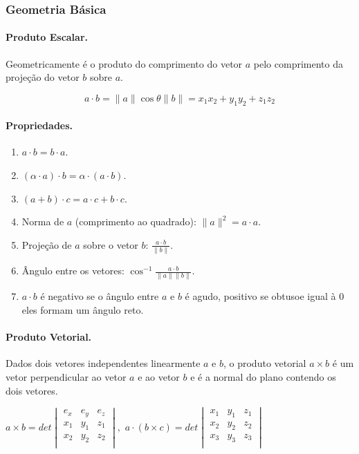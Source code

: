 \subsubsection{Geometria Básica}
\paragraph{Produto Escalar.}
Geometricamente é o produto do comprimento do vetor $a$ pelo comprimento da projeção do vetor $b$ sobre $a$.

$$a \cdot b = \|a\|\cos\theta \|b\| = x_1x_2+y_1y_2+z_1z_2$$

\paragraph{Propriedades.} \empty

\begin{multicols}{2}
	\begin{enumerate}
		\item $a \cdot b = b \cdot a$.
		\item $(\alpha \cdot a) \cdot b = \alpha\cdot(a \cdot b)$.
		\item $(a+b)\cdot c = a\cdot c + b \cdot c$.
		\item Norma de $a$ (comprimento ao quadrado): $\|a\|^2 = a \cdot a$.
		\item Projeção de $a$ sobre o vetor $b$: $\frac{a \cdot b}{\|b\|}$.
		\item Ângulo entre os vetores: $\cos^{-1}{\frac{a \cdot b}{\|a\|\|b\|}}$.
		\item $a \cdot b$ é negativo se o ângulo entre $a$ e $b$ é agudo, positivo se obtusoe igual à 0 eles formam um ângulo reto.	
	\end{enumerate}
\end{multicols}

\paragraph{Produto Vetorial.}
Dados dois vetores independentes linearmente $a$ e $b$, o produto vetorial $a \times b$ é um vetor perpendicular ao vetor $a$ e ao vetor $b$ e é a normal do plano contendo os dois vetores.

\begin{center}
	$
	a \times b = det
	\begin{vmatrix}
		e_x & e_y & e_z \\
		x_1 & y_1 & z_1 \\
		x_2 & y_2 & z_2 \\
	\end{vmatrix}, 
	$
	$
	a \cdot (b \times c) = det
	\begin{vmatrix}
		x_1 & y_1 & z_1 \\
		x_2 & y_2 & z_2 \\
		x_3 & y_3 & z_3 \\	
	\end{vmatrix}
	$
\end{center}

